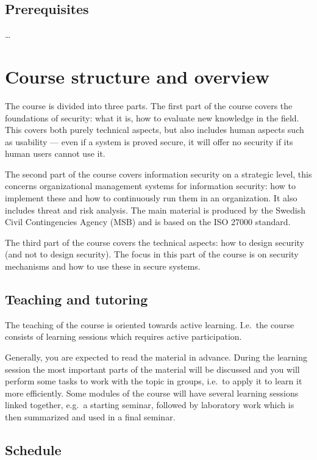 \subsection{Prerequisites}

\dots


\section{Course structure and overview}%
\label{CourseStructure}

The course is divided into three parts.
The first part of the course covers the foundations of security: what it is, 
how to evaluate new knowledge in the field.
This covers both purely technical aspects, but also includes human aspects such
as usability --- even if a system is proved secure, it will offer no security 
if its human users cannot use it.

The second part of the course covers information security on a strategic level, 
this concerns organizational management systems for information security: how 
to implement these and how to continuously run them in an organization.
It also includes threat and risk analysis.
The main material is produced by the Swedish Civil Contingencies Agency (MSB) 
and is based on the ISO 27000 standard.

The third part of the course covers the technical aspects: how to design 
security (and not to design security).
The focus in this part of the course is on security mechanisms and how to use 
these in secure systems.

\subsection{Teaching and tutoring}

The teaching of the course is oriented towards active learning.
I.e.\ the course consists of learning sessions which requires active 
participation.

Generally, you are expected to read the material in advance.
During the learning session the most important parts of the material will be 
discussed and you will perform some tasks to work with the topic in groups, 
i.e.\ to apply it to learn it more efficiently.
Some modules of the course will have several learning sessions linked together,
e.g.\ a starting seminar, followed by laboratory work which is then summarized 
and used in a final seminar.

\subsection{Schedule}

